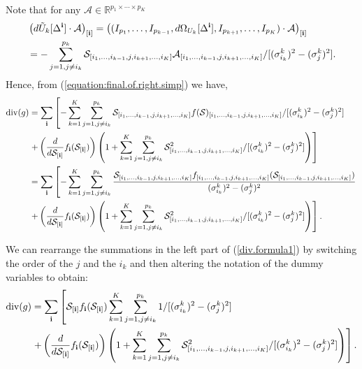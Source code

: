 Note that for any $\mathcal{A} \in \mathbb{R}^{p_1\times\cdots \times
  p_K}$
\begin{align*}
  &\left(d\tilde{U}_k[\Delta^{\bf i}] \cdot \mathcal{A}\right)_{[\mathbf{i}]} = \left((I_{p_1},\ldots,I_{p_{k-1}},d\Omega_{U_k}[\Delta^{\bf i}],I_{p_{k+1}},\ldots,I_{p_K})\cdot \mathcal{A} \right)_{[\mathbf{i}]}\\
  &= -\sum_{j=1, j\neq i_k}^{p_k}\mathcal{S}_{[i_1,\ldots,i_{k-1},j,i_{k+1},\ldots,i_K]}\mathcal{A}_{[i_1,\ldots,i_{k-1},j,i_{k+1},\ldots,i_K]}/[(\sigma_{i_k}^k)^2 - (\sigma_j^k)^2].
\end{align*}
Hence, from (\ref{equation:final.of.right.simp}) we have,
\begin{align}
  \operatorname*{div}(g) &= \sum_{\bf i}\left[-\sum_{k=1}^K \sum_{j=1, j\neq i_k}^{p_k}\mathcal{S}_{[i_1,\ldots,i_{k-1},j,i_{k+1},\ldots,i_K]}f(\mathcal{S})_{[i_1,\ldots,i_{k-1},j,i_{k+1},\ldots,i_K]}/[(\sigma_{i_k}^k)^2 - (\sigma_j^k)^2]\right.\nonumber\\
  \nonumber&\left. + \left(\frac{d}{d\mathcal{S}_{[\mathbf{i}]}}f_{\mathbf{i}}(\mathcal{S}_{[\mathbf{i}]})\right) \left(1 + \sum_{k=1}^K \sum_{j=1, j\neq i_k}^{p_k}\mathcal{S}_{[i_1,\ldots,i_{k-1},j,i_{k+1},\ldots,i_K]}^2/[(\sigma_{i_k}^k)^2 - (\sigma_j^k)^2] \right)\right]  \\
  &= \sum_{\bf i}\left[-\sum_{k=1}^K \sum_{j=1, j\neq i_k}^{p_k}\frac{\mathcal{S}_{[i_1,\ldots,i_{k-1},j,i_{k+1},\ldots,i_K]}f_{[i_1,\ldots,i_{k-1},j,i_{k+1},\ldots,i_K]}(\mathcal{S}_{[i_1,\ldots,i_{k-1},j,i_{k+1},\ldots,i_K]})}{(\sigma_{i_k}^k)^2 - (\sigma_j^k)^2}\right. \label{div.formula1}\\
  \nonumber &\left. + \left(\frac{d}{d\mathcal{S}_{[\mathbf{i}]}}f_{\mathbf{i}}(\mathcal{S}_{[\mathbf{i}]})\right) \left(1 + \sum_{k=1}^K \sum_{j=1, j\neq i_k}^{p_k}\mathcal{S}_{[i_1,\ldots,i_{k-1},j,i_{k+1},\ldots,i_K]}^2/[(\sigma_{i_k}^k)^2 - (\sigma_j^k)^2] \right)\right].
\end{align}

We can rearrange the summations in the left part of
(\ref{div.formula1}) by switching the order of the $j$ and the $i_k$
and then altering the notation of the dummy variables to obtain:
\begin{align*}
  \operatorname*{div}(g) &= \sum_{\bf i}\left[\mathcal{S}_{[\mathbf{i}]}f_{\bf i}(\mathcal{S}_{[\mathbf{i}]})\sum_{k=1}^K \sum_{j=1, j\neq i_k}^{p_k}1/[(\sigma_{i_k}^k)^2 - (\sigma_j^k)^2]\right. \\
  &\left. + \left(\frac{d}{d\mathcal{S}_{[\mathbf{i}]}}f_{\mathbf{i}}(\mathcal{S}_{[\mathbf{i}]})\right) \left(1 + \sum_{k=1}^K \sum_{j=1, j\neq i_k}^{p_k}\mathcal{S}_{[i_1,\ldots,i_{k-1},j,i_{k+1},\ldots,i_K]}^2/[(\sigma_{i_k}^k)^2 - (\sigma_j^k)^2] \right)\right].
\end{align*}

